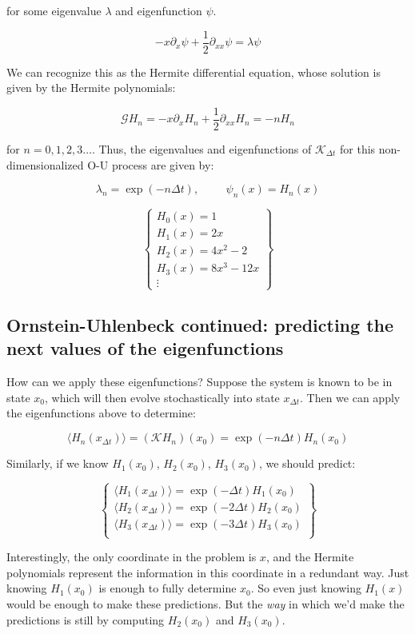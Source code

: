 \documentclass[]{article}
\newcommand{\p}[1]{\left( #1 \right)}
\newcommand{\Kp}{\mathcal{K}}
\begin{document}
for some eigenvalue $\lambda$ and eigenfunction $\psi$.

$$
- x\partial_x \psi + \frac{1}{2}\partial_{xx}\psi = \lambda \psi
$$

We can recognize this as the Hermite differential equation, whose solution is given by the Hermite polynomials:

$$
\mathcal{G} H_n = - x\partial_x H_n + \frac{1}{2}\partial_{xx} H_n = -nH_n
$$

for $n=0,1,2,3\dots$. Thus, the eigenvalues and eigenfunctions of $\Kp_{\Delta t}$ for this non-dimensionalized O-U process are given by:

$$
\lambda_n = \exp(-n\Delta t),\hspace{1cm} \psi_n(x) = H_n(x)
$$

$$
\begin{Bmatrix}
	H_0(x) = 1 \\
	H_1(x) = 2x \\
	H_2(x) = 4x^2 - 2\\
	H_3(x) = 8x^3 - 12x \\
	\vdots
\end{Bmatrix}
$$

\subsection{Ornstein-Uhlenbeck continued: predicting the next values of the eigenfunctions}

How can we apply these eigenfunctions? Suppose the system is known to be in state $x_0$, which will then evolve stochastically into state $x_{\Delta t}$. Then we can apply the eigenfunctions above to determine:

$$
\langle H_n(x_{\Delta t}) \rangle = \p{\Kp H_n}(x_0) = \exp(-n\Delta t) H_n(x_0)
$$

Similarly, if we know $H_1(x_0)$, $H_2(x_0)$, $H_3(x_0)$, we should predict:

$$
\begin{Bmatrix}
	\langle H_1(x_{\Delta t}) \rangle = \exp(-\Delta t) H_1(x_0) \\
	\langle H_2(x_{\Delta t}) \rangle = \exp(-2\Delta t) H_2(x_0) \\
	\langle H_3(x_{\Delta t}) \rangle = \exp(-3\Delta t) H_3(x_0) \\
\end{Bmatrix}
$$

Interestingly, the only coordinate in the problem is $x$, and the Hermite polynomials represent the information in this coordinate in a redundant way. Just knowing $H_1(x_0)$ is enough to fully determine $x_0$. So even just knowing $H_1(x)$ would be enough to make these predictions. But the {\em way} in which we'd make the predictions is still by computing $H_2(x_0)$ and $H_3(x_0)$.
\end{document}
